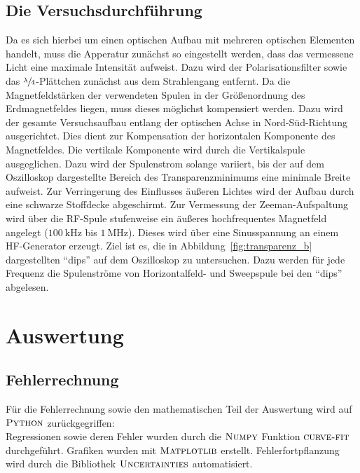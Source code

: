 \documentclass[
  bibliography=totoc,     %
  captions=tableheading,  %
  titlepage=firstiscover, %
]{scrartcl}
\begin{document}
\subsection{Die Versuchsdurchführung}
Da es sich hierbei um einen optischen Aufbau mit mehreren optischen Elementen
handelt, muss die Apperatur zunächst so eingestellt werden, dass das vermessene
Licht eine maximale Intensität aufweist. Dazu wird der Polarisationsfilter
sowie das $\sfrac{\lambda}{4}$-Plättchen zunächst aus dem Strahlengang entfernt.
Da die Magnetfeldstärken der verwendeten Spulen in der Größenordnung des
Erdmagnetfeldes liegen, muss dieses möglichst kompensiert werden. Dazu wird der
gesamte Versuchsaufbau entlang der optischen Achse in Nord-Süd-Richtung
ausgerichtet. Dies dient zur Kompensation der horizontalen Komponente des
Magnetfeldes. Die vertikale Komponente wird durch die Vertikalspule
ausgeglichen. Dazu wird der Spulenstrom solange variiert, bis der auf dem
Oszilloskop dargestellte Bereich des Transparenzminimums eine minimale Breite aufweist.
Zur Verringerung des Einflusses äußeren Lichtes wird der Aufbau durch eine
schwarze Stoffdecke abgeschirmt.
Zur Vermessung der Zeeman-Aufspaltung wird über die RF-Spule stufenweise ein äußeres
hochfrequentes Magnetfeld angelegt ($\SI{100}{\kilo\hertz}$ bis $\SI{1}{\mega\hertz}$).
Dieses wird über eine Sinusspannung an einem HF-Generator erzeugt. Ziel ist es, die in
Abbildung~\ref{fig:transparenz_b} dargestellten \enquote{dips} auf dem Oszilloskop
zu untersuchen. Dazu werden für jede Frequenz die Spulenströme von Horizontalfeld-
und Sweepspule bei den \enquote{dips} abgelesen.\\
\clearpage
\section{Auswertung}
\label{sec:auswertung}
\subsection{Fehlerrechnung}
  Für die Fehlerrechnung sowie den mathematischen Teil der Auswertung wird auf
  $\textsc{Python}$ zurückgegriffen:\\
  Regressionen sowie deren Fehler wurden durch die $\textsc{Numpy}$ \cite{numpy} Funktion
  $\textsc{curve-fit}$ durchgeführt. Grafiken wurden mit $\textsc{Matplotlib}$ \cite{matplotlib}
  erstellt.
  Fehlerfortpflanzung wird durch die Bibliothek
  $\textsc{Uncertainties}$ \cite{uncertainties} automatisiert.
\end{document}
